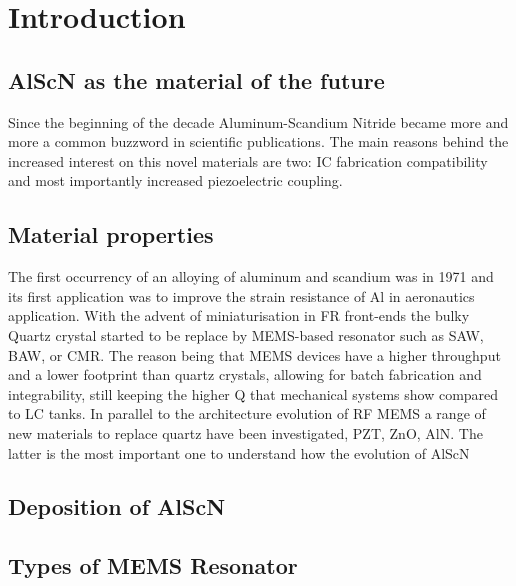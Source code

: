 \cleardoublepage
\chapter{Introduction}

\section{AlScN as the material of the future}
Since the beginning of the decade Aluminum-Scandium Nitride became more and more a common buzzword in scientific publications. The main reasons behind the increased interest on this novel materials are two: IC fabrication compatibility and most importantly increased piezoelectric coupling. 


\section{Material properties }
The first occurrency of an alloying of aluminum and scandium was in 1971 \cite{caro_piezoelectric_2015} and its first application was to improve the strain resistance of Al in aeronautics application. With the advent of miniaturisation in FR front-ends the bulky Quartz crystal started to be replace by MEMS-based resonator such as SAW, BAW, or CMR. The reason being that MEMS devices have a higher throughput and a lower footprint than quartz crystals, allowing for batch fabrication and integrability, still keeping the higher Q that mechanical systems show compared to LC tanks. In parallel to the architecture evolution of RF MEMS a range of new materials to replace quartz have been investigated, PZT, ZnO, AlN. The latter is the most important one to understand how the evolution of AlScN 

\section{Deposition of AlScN}
\section{Types of MEMS Resonator}
